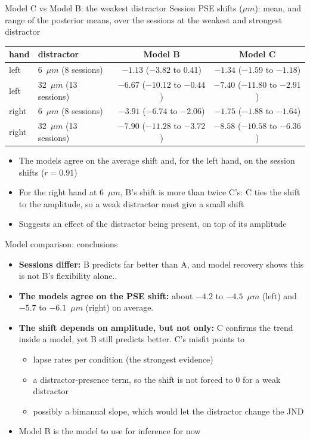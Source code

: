 \begin{frame}{Model C vs Model B: the weakest distractor}
  Session PSE shifts ($\mu m$): mean, and range of the posterior means, over the sessions at
  the weakest and strongest distractor
  \vspace{0.5em}

  \centering\small
  \begin{tabular}{llcc}
    \toprule
    hand & distractor & Model B & Model C \\
    \midrule
    left  & 6~$\mu m$ (8 sessions)   & $-1.13$ ($-3.82$ to 0.41)     & $-1.34$ ($-1.59$ to $-1.18$) \\
    left  & 32~$\mu m$ (13 sessions) & $-6.67$ ($-10.12$ to $-0.44$) & $-7.40$ ($-11.80$ to $-2.91$) \\
    right & 6~$\mu m$ (8 sessions)   & $-3.91$ ($-6.74$ to $-2.06$)  & $-1.75$ ($-1.88$ to $-1.64$) \\
    right & 32~$\mu m$ (13 sessions) & $-7.90$ ($-11.28$ to $-3.72$) & $-8.58$ ($-10.58$ to $-6.36$) \\
    \bottomrule
  \end{tabular}

  \vspace{0.5em}
  \raggedright
  \begin{itemize}
    \item The models agree on the average shift and, for the left hand, on the session shifts
          ($r = 0.91$)
    \item For the right hand at 6~$\mu m$, B's shift is more than twice C's: C ties the shift to
          the amplitude, so a weak distractor must give a small shift
    \item Suggests an effect of the distractor being present, on top of its amplitude
  \end{itemize}
\end{frame}

\begin{frame}{Model comparison: conclusions}
  \begin{itemize}
    \item \textbf{Sessions differ:} B predicts far better than A, and model recovery shows this
          is not B's flexibility alone..
    \item \textbf{The models agree on the PSE shift:} about $-4.2$ to $-4.5$~$\mu m$ (left) and
          $-5.7$ to $-6.1$~$\mu m$ (right) on average.
    \item \textbf{The shift depends on amplitude, but not only:} C confirms the trend inside a
          model, yet B still predicts better. C's misfit points to
    \begin{itemize}
      \item lapse rates per condition (the strongest evidence)
      \item a distractor-presence term, so the shift is not forced to 0 for a weak distractor
      \item possibly a bimanual slope, which would let the distractor change the JND
    \end{itemize}
    \item[$\Rightarrow$] Model B is the model to use for inference for now
  \end{itemize}
\end{frame}

